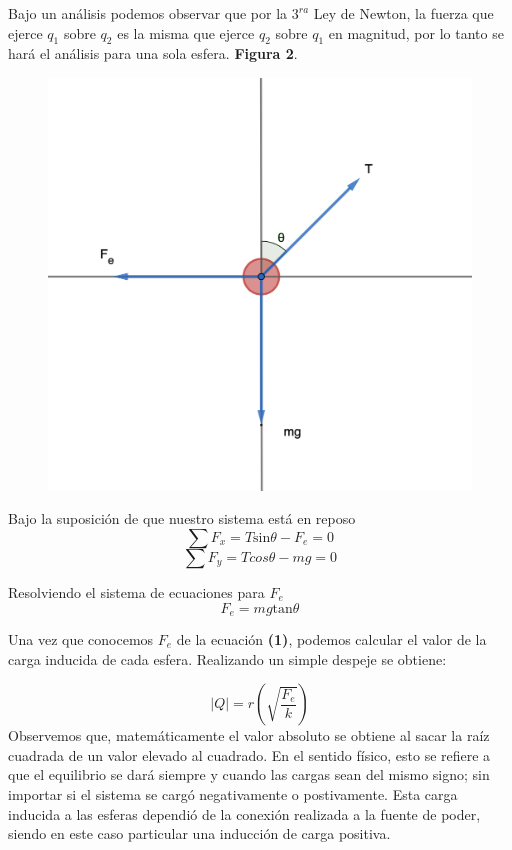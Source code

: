 \documentclass[letterpaper, 11 pt]{article}
\begin{document}
\begin{multicols*}{2}
Bajo un análisis podemos observar que por la $3^{ra}$ Ley de Newton, la fuerza que ejerce $q_1$ sobre  $q_2$ es la misma que ejerce  $q_2$ sobre $q_1$ en magnitud, por lo tanto se hará el análisis para una sola esfera. \textbf{Figura 2}.

 \begin{figure}[H]
    \captionsetup{justification=centering,margin=2cm}
    \includegraphics[scale=0.23]{pitufina.png}
    \centering
    \caption{}
\end{figure}

Bajo la suposición de que nuestro sistema está en reposo
\begin{equation*}
    \sum F_x=T\text{sin}\theta-F_e=0
\end{equation*}{}
\begin{equation*}
   \sum F_y=Tcos\theta-mg=0
\end{equation*}

Resolviendo el sistema de ecuaciones para $F_e$ 
\begin{equation}
    F_e=mg\text{tan}\theta
\end{equation}

Una vez que conocemos $F_e$ de la ecuación \textbf{(1)}, podemos calcular el valor de la carga inducida de cada esfera. Realizando un simple despeje se obtiene:

\begin{equation}
    |Q|=r\left(\sqrt{\frac{F_{e}}{k}}\right)
\end{equation}
Observemos que, matemáticamente el valor absoluto se obtiene al sacar la raíz cuadrada de un valor elevado al cuadrado. En el sentido físico, esto se refiere a que el equilibrio se dará siempre y cuando las cargas sean del mismo signo; sin importar si el sistema se cargó negativamente o postivamente. Esta carga inducida a las esferas dependió de la conexión realizada a la fuente de poder, siendo en este caso particular una inducción de carga positiva. 

\end{multicols*}
\end{document}

